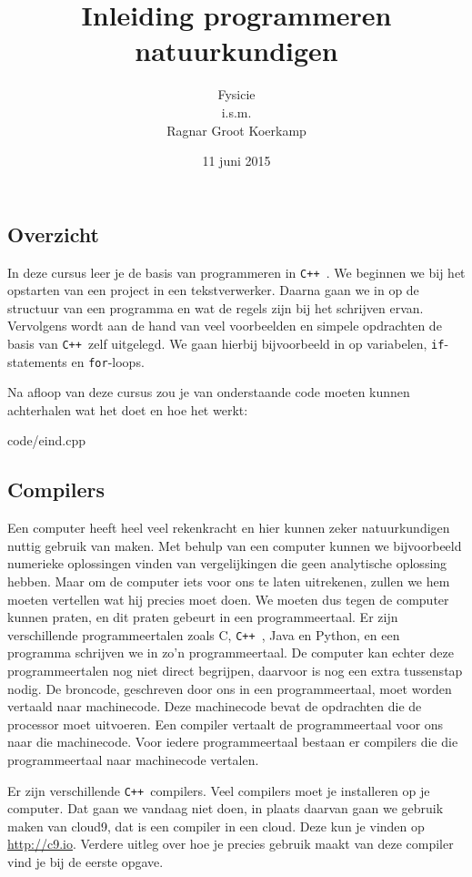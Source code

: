 \documentclass[12pt,a4paper]{article}
\title{Inleiding programmeren natuurkundigen}
\author{
Fysicie\\
i.s.m.\\
Ragnar Groot Koerkamp
}
\date{11 juni 2015}
\newcommand{\code}{}
\newcommand{\icode}{\lstinline}
\newcommand{\mono}{\texttt}
\newcommand{\cpp}{\mono{C++ }}
\begin{document}
 
\maketitle

\tableofcontents

\clearpage
\subsection{Overzicht}
In deze cursus leer je de basis van programmeren in \cpp. We beginnen we bij het opstarten van een project in een tekstverwerker. Daarna gaan we in op de structuur van een programma en wat de regels zijn bij het schrijven ervan. Vervolgens wordt aan de hand van veel voorbeelden en simpele opdrachten de basis van \cpp zelf	 uitgelegd. We gaan hierbij bijvoorbeeld in op variabelen, \icode{if}-statements en \icode{for}-loops.

Na afloop van deze cursus zou je van onderstaande code moeten kunnen achterhalen wat het doet en hoe het werkt:

\code{code/eind.cpp}
\subsection{Compilers}
Een computer heeft heel veel rekenkracht en hier kunnen zeker natuurkundigen nuttig gebruik van maken. Met behulp van een computer kunnen we bijvoorbeeld numerieke oplossingen vinden van vergelijkingen die geen analytische oplossing hebben. Maar om de computer iets voor ons te laten uitrekenen, zullen we hem moeten vertellen wat hij precies moet doen. We moeten dus tegen de computer kunnen praten, en dit praten gebeurt in een programmeertaal. Er zijn verschillende programmeertalen zoals C, \cpp, Java en Python, en een programma schrijven we in zo'n programmeertaal. De computer kan echter deze programmeertalen nog niet direct begrijpen, daarvoor is nog een extra tussenstap nodig. De broncode, geschreven door ons in een programmeertaal, moet worden vertaald naar machinecode. Deze machinecode bevat de opdrachten die de processor moet uitvoeren. Een compiler vertaalt de programmeertaal voor ons naar die machinecode. Voor iedere programmeertaal bestaan er compilers die die programmeertaal naar machinecode vertalen.

Er zijn verschillende \cpp compilers. Veel compilers moet je installeren op je computer. Dat gaan we vandaag niet doen, in plaats daarvan gaan we gebruik maken van cloud9, dat is een compiler in een cloud. Deze kun je vinden op \url{http://c9.io}. Verdere uitleg over hoe je precies gebruik maakt van deze compiler vind je bij de eerste opgave.
\end{document}
